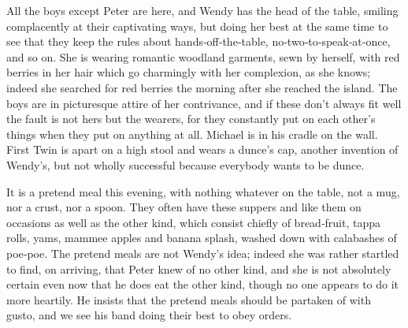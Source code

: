 \begin{stagedir}
All the boys except Peter are here, and Wendy has the head of the table,
smiling complacently at their captivating ways,
but doing her best at the same time to see that they keep the rules
about hands‐off‐the‐table, no‐two‐to‐speak‐at‐once, and so on.
She is wearing romantic woodland garments, sewn by herself, with red berries in her hair
which go charmingly with her complexion, as she knows;
indeed she searched for red berries the morning after she reached the island.
The boys are in picturesque attire of her contrivance,
and if these don’t always fit well the fault is not hers but the wearers,
for they constantly put on each other’s things when they put on anything at all.
Michael is in his cradle on the wall.
First Twin is apart on a high stool and wears a dunce’s cap, another invention of Wendy’s,
but not wholly successful because everybody wants to be dunce.

It is a pretend meal this evening, with nothing whatever on the table, not a mug, nor a crust, nor a spoon.
They often have these suppers and like them on occasions
as well as the other kind, which consist chiefly of bread‐fruit, tappa rolls, yams, mammee apples and banana splash,
washed down with calabashes of poe‐poe.
The pretend meals are not Wendy’s idea;
indeed she was rather startled to find, on arriving, that Peter knew of no other kind,
and she is not absolutely certain even now that he does eat the other kind,
though no one appears to do it more heartily.
He insists that the pretend meals should be partaken of with gusto,
and we see his band doing their best to obey orders.
\end{stagedir}

